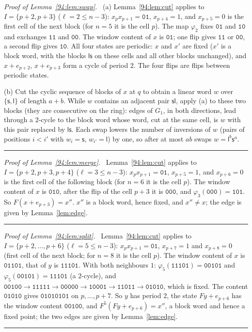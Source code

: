\documentclass[10pt,a4paper]{article}
\newcommand{\qedmark}{\rule{1.1ex}{1.1ex}}
\newenvironment{proof}[1][Proof]{\par\smallskip\noindent\textit{#1.}\ }{\hfill\qedmark\par\smallskip}
\newcommand{\Gone}{G_1}                       %
\newcommand{\code}[1]{\mathtt{#1}}            %
\begin{document}
\begin{proof}[Proof of Lemma~\ref{94:lem:swap}]
(a) Lemma~\ref{94:lem:cut} applies to $I=\{p+2,p+3\}$ ($\ell=2\le n-3$): $x_px_{p+1}=\code{01}$, $x_{p+4}=1$, and $x_{p+5}=0$ is
the first cell of the next block (for $n=5$ it is the cell $p$). The map $\varphi_2$ fixes $\code{01}$ and
$\code{10}$ and exchanges $\code{11}$ and $\code{00}$. The window content of $x$ is $\code{01}$; one flip gives
$\code{11}$ or $\code{00}$, a second flip gives $\code{10}$. All four states are periodic: $x$ and $x'$ are fixed
($x'$ is a block word, with the blocks $\mathsf{l}\mathsf{s}$ on these cells and all other blocks unchanged), and
$x+e_{p+2}$, $x+e_{p+3}$ form a cycle of period $2$. The four flips are flips between periodic states.

(b) Cut the cyclic sequence of blocks of $x$ at $q$ to obtain a linear word $w$ over
$\{\mathsf{s},\mathsf{l}\}$ of length $a+b$. While $w$ contains an adjacent pair $\mathsf{s}\mathsf{l}$, apply (a)
to these two blocks (they are consecutive on the ring): edges of $\Gone$, in both directions, lead through a
$2$-cycle to the block word whose word, cut at the same cell, is $w$ with this pair replaced by
$\mathsf{l}\mathsf{s}$. Each swap lowers the number of inversions of $w$ (pairs of positions $i<i'$ with
$w_i=\mathsf{s}$, $w_{i'}=\mathsf{l}$) by one, so after at most $ab$ swaps $w=\mathsf{l}^b\mathsf{s}^a$.
\end{proof}

\begin{proof}[Proof of Lemma~\ref{94:lem:merge}]
Lemma~\ref{94:lem:cut} applies to $I=\{p+2,p+3,p+4\}$ ($\ell=3\le n-3$): $x_px_{p+1}=\code{01}$, $x_{p+5}=1$, and $x_{p+6}=0$ is the
first cell of the following block (for $n=6$ it is the cell $p$). The window content of $x$ is $\code{010}$, after
the flip of the cell $p+3$ it is $\code{000}$, and $\varphi_3(\code{000})=\code{101}$. So $F(x+e_{p+3})=x''$.
$x''$ is a block word, hence fixed, and $x''\ne x$; the edge is given by Lemma~\ref{lem:edge}.
\end{proof}

\begin{proof}[Proof of Lemma~\ref{94:lem:split}]
Lemma~\ref{94:lem:cut} applies to $I=\{p+2,\dots,p+6\}$ ($\ell=5\le n-3$): $x_px_{p+1}=\code{01}$, $x_{p+7}=1$ and $x_{p+8}=0$
(first cell of the next block; for $n=8$ it is the cell $p$). The window content of $x$ is $\code{01101}$, that
of $y$ is $\code{11101}$. With both neighbours $1$: $\varphi_5(\code{11101})=\code{00101}$ and
$\varphi_5(\code{00101})=\code{11101}$ (a $2$-cycle), and
$\code{00100}\to\code{11111}\to\code{00000}\to\code{10001}\to\code{11011}\to\code{01010}$, which is fixed. The
content $\code{01010}$ gives $\code{01010101}$ on $p,\dots,p+7$. So $y$ has period $2$, the state
$Fy+e_{p+6}$ has the window content $\code{00100}$, and $F^5(Fy+e_{p+6})=x''$, a block word and hence a fixed
point; the two edges are given by Lemma~\ref{lem:edge}.
\end{proof}
\end{document}

